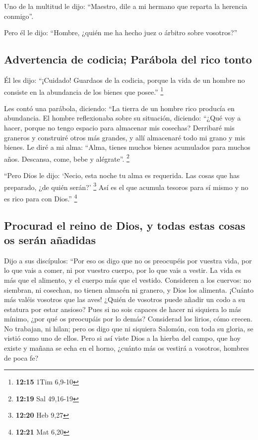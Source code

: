 \begin{paracol}{2}
 Uno de la multitud le dijo: ``Maestro, dile a mi hermano
que reparta la herencia conmigo''.

 Pero él le dijo: ``Hombre, ¿quién me ha hecho juez o
árbitro sobre vosotros?''

\hypertarget{advertencia-de-codicia-paruxe1bola-del-rico-tonto}{%
\subsection{Advertencia de codicia; Parábola del rico
tonto}\label{advertencia-de-codicia-paruxe1bola-del-rico-tonto}}

 Él les dijo: ``¡Cuidado! Guardaos de la codicia, porque
la vida de un hombre no consiste en la abundancia de los bienes que
posee.'' \footnote{\textbf{12:15} 1Tim 6,9-10}

 Les contó una parábola, diciendo: ``La tierra de un
hombre rico producía en abundancia.  El hombre
reflexionaba sobre su situación, diciendo: ``¿Qué voy a hacer, porque no
tengo espacio para almacenar mis cosechas?  Derribaré mis
graneros y construiré otros más grandes, y allí almacenaré todo mi grano
y mis bienes.  Le diré a mi alma: ``Alma, tienes muchos
bienes acumulados para muchos años. Descansa, come, bebe y alégrate''.
\footnote{\textbf{12:19} Sal 49,16-19}

 ``Pero Dios le dijo: `Necio, esta noche tu alma es
requerida. Las cosas que has preparado, ¿de quién serán?' \footnote{\textbf{12:20}
  Heb 9,27}  Así es el que acumula tesoros para sí mismo
y no es rico para con Dios.'' \footnote{\textbf{12:21} Mat 6,20}

\hypertarget{procurad-el-reino-de-dios-y-todas-estas-cosas-os-seruxe1n-auxf1adidas}{%
\subsection{Procurad el reino de Dios, y todas estas cosas os serán
añadidas}\label{procurad-el-reino-de-dios-y-todas-estas-cosas-os-seruxe1n-auxf1adidas}}

 Dijo a sus discípulos: ``Por eso os digo que no os
preocupéis por vuestra vida, por lo que vais a comer, ni por vuestro
cuerpo, por lo que vais a vestir.  La vida es más que el
alimento, y el cuerpo más que el vestido.  Consideren a
los cuervos: no siembran, ni cosechan, no tienen almacén ni granero, y
Dios los alimenta. ¡Cuánto más valéis vosotros que las aves!
 ¿Quién de vosotros puede añadir un codo a su estatura
por estar ansioso?  Pues si no sois capaces de hacer ni
siquiera lo más mínimo, ¿por qué os preocupáis por lo demás?
 Considerad los lirios, cómo crecen. No trabajan, ni
hilan; pero os digo que ni siquiera Salomón, con toda su gloria, se
vistió como uno de ellos.  Pero si así viste Dios a la
hierba del campo, que hoy existe y mañana se echa en el horno, ¿cuánto
más os vestirá a vosotros, hombres de poca fe?


\end{paracol}
